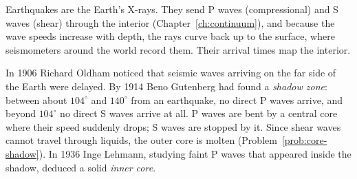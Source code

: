 Earthquakes are the Earth's X-rays. They send P waves (compressional) and S waves (shear) through the interior (Chapter~\ref{ch:continuum}), and because the wave speeds increase with depth, the rays curve back up to the surface, where seismometers around the world record them. Their arrival times map the interior.

In 1906 Richard Oldham noticed that seismic waves arriving on the far side of the Earth were delayed. By 1914 Beno Gutenberg had found a \emph{shadow zone}: between about $104^\circ$ and $140^\circ$ from an earthquake, no direct P waves arrive, and beyond $104^\circ$ no direct S waves arrive at all. P waves are bent by a central core where their speed suddenly drops; S waves are stopped by it. Since shear waves cannot travel through liquids, the outer core is molten (Problem~\ref{prob:core-shadow}). In 1936 Inge Lehmann, studying faint P waves that appeared inside the shadow, deduced a solid \emph{inner core}.

